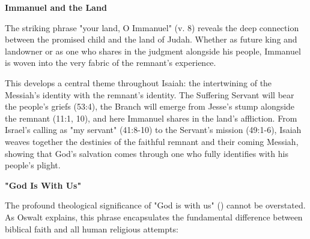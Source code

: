 \documentclass[11pt]{article}
\begin{document}
\vspace{3em}
{\large\bfseries Immanuel and the Land}
\vspace{1em}

The striking phrase "your land, O Immanuel" (v. 8) reveals the deep connection between the promised child and the land of Judah. Whether as future king and landowner or as one who shares in the judgment alongside his people, Immanuel is woven into the very fabric of the remnant's experience.

\vspace{1em}
This develops a central theme throughout Isaiah: the intertwining of the Messiah's identity with the remnant's identity. The Suffering Servant will bear the people's griefs (53:4), the Branch will emerge from Jesse's stump alongside the remnant (11:1, 10), and here Immanuel shares in the land's affliction. From Israel's calling as "my servant" (41:8-10) to the Servant's mission (49:1-6), Isaiah weaves together the destinies of the faithful remnant and their coming Messiah, showing that God's salvation comes through one who fully identifies with his people's plight.

\begin{biblicaloutline}[Isaiah 8:9-10]

    \begin{versesection}{2em}

    \end{versesection}

\end{biblicaloutline}

\vspace{3em}
{\large\bfseries "God Is With Us"}
\vspace{1em}

The profound theological significance of "God is with us" () cannot be overstated. As Oswalt explains, this phrase encapsulates the fundamental difference between biblical faith and all human religious attempts:
\end{document}
